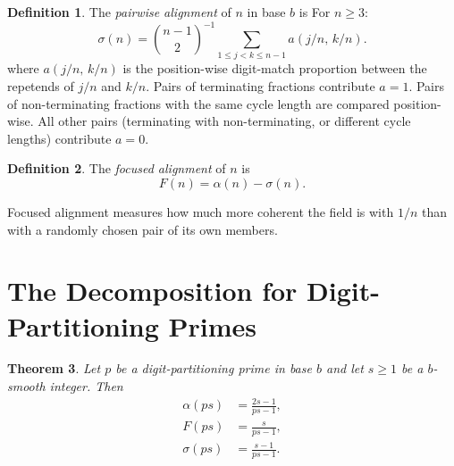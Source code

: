 \documentclass[12pt]{amsart}
\newtheorem{theorem}{Theorem}
\theoremstyle{definition}
\newtheorem{definition}[theorem]{Definition}
\theoremstyle{remark}
\begin{document}
\begin{definition}
The \emph{pairwise alignment} of $n$ in base $b$ is
For $n \ge 3$:
\[
\sigma(n) = \binom{n-1}{2}^{-1}
\sum_{1 \le j < k \le n-1}
a(j/n,\, k/n).
\]
where $a(j/n,\, k/n)$ is the position-wise digit-match proportion
between the repetends of $j/n$ and $k/n$. Pairs of terminating
fractions contribute $a = 1$. Pairs of non-terminating fractions
with the same cycle length are compared position-wise. All other
pairs (terminating with non-terminating, or different cycle
lengths) contribute $a = 0$.
\end{definition}

\begin{definition}
The \emph{focused alignment} of $n$ is
\[
F(n) = \alpha(n) - \sigma(n).
\]
\end{definition}

Focused alignment measures how much more coherent the field is with
$1/n$ than with a randomly chosen pair of its own members.

\section{The Decomposition for Digit-Partitioning Primes}

\begin{theorem}\label{thm:decomposition}
Let $p$ be a digit-partitioning prime in base $b$ and let $s \ge 1$
be a $b$-smooth integer. Then
\begin{align}
\alpha(ps) &= \frac{2s-1}{ps-1}, \label{eq:alpha} \\[4pt]
F(ps) &= \frac{s}{ps-1}, \label{eq:F} \\[4pt]
\sigma(ps) &= \frac{s-1}{ps-1}. \label{eq:sigma}
\end{align}
\end{theorem}
\end{document}
